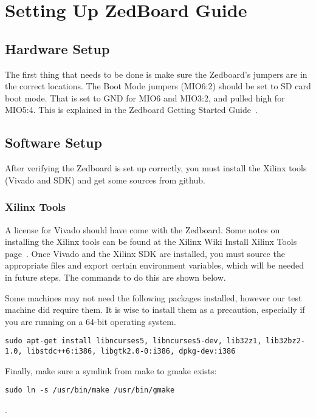 \documentclass[thesis.tex]{subfile}
\begin{document}
\chapter{Setting Up ZedBoard Guide}

\section{Hardware Setup}
The first thing that needs to be done is make sure the Zedboard's jumpers are in the correct locations.
The Boot Mode jumpers (MIO6:2) should be set to SD card boot mode.
That is set to GND for MIO6 and MIO3:2, and pulled high for MIO5:4.
This is explained in the Zedboard Getting Started Guide~\cite{ZedGetStarted}.

\section{Software Setup}
After verifying the Zedboard is set up correctly, you must install the Xilinx tools (Vivado and SDK) and get some sources from github.

\subsection{Xilinx Tools}
A license for Vivado should have come with the Zedboard.
Some notes on installing the Xilinx tools can be found at the Xilinx Wiki Install Xilinx Tools page~\cite{InstallTools}.
Once Vivado and the Xilinx SDK are installed, you must source the appropriate files and export certain environment variables, which will be needed in future steps. The commands to do this are shown below.



Some machines may not need the following packages installed, however our test machine did require them. It is wise to install them as a precaution, especially if you are running on a 64-bit operating system.
\begin{lstlisting}
sudo apt-get install libncurses5, libncurses5-dev, lib32z1, lib32bz2-1.0, libstdc++6:i386, libgtk2.0-0:i386, dpkg-dev:i386
\end{lstlisting}

Finally, make sure a symlink from make to gmake exists:
\begin{lstlisting}
sudo ln -s /usr/bin/make /usr/bin/gmake
\end{lstlisting}.
\end{document}

